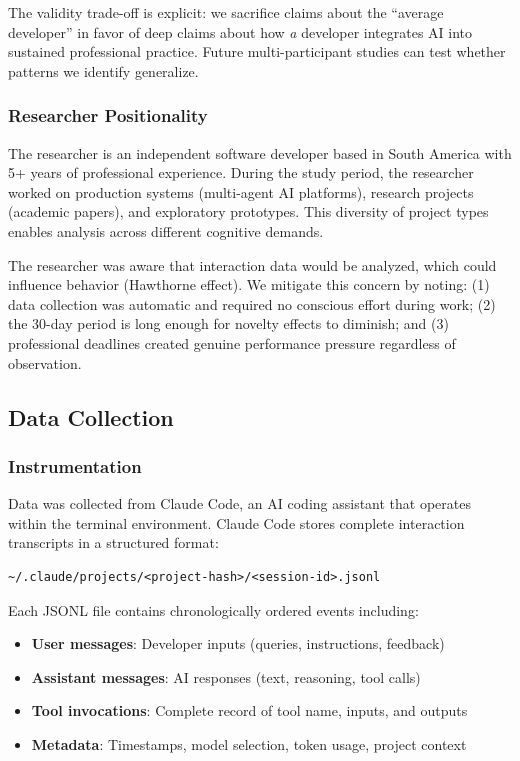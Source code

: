 \documentclass{ntlabs-preprint}
\begin{document}
The validity trade-off is explicit: we sacrifice claims about the ``average developer'' in favor of deep claims about how \textit{a} developer integrates AI into sustained professional practice. Future multi-participant studies can test whether patterns we identify generalize.

\subsubsection{Researcher Positionality}

The researcher is an independent software developer based in South America with 5+ years of professional experience. During the study period, the researcher worked on production systems (multi-agent AI platforms), research projects (academic papers), and exploratory prototypes. This diversity of project types enables analysis across different cognitive demands.

The researcher was aware that interaction data would be analyzed, which could influence behavior (Hawthorne effect). We mitigate this concern by noting: (1) data collection was automatic and required no conscious effort during work; (2) the 30-day period is long enough for novelty effects to diminish; and (3) professional deadlines created genuine performance pressure regardless of observation.

\subsection{Data Collection}

\subsubsection{Instrumentation}

Data was collected from Claude Code, an AI coding assistant that operates within the terminal environment. Claude Code stores complete interaction transcripts in a structured format:

\begin{lstlisting}[caption={Session storage location}]
~/.claude/projects/<project-hash>/<session-id>.jsonl
\end{lstlisting}

Each JSONL file contains chronologically ordered events including:
\begin{itemize}
    \item \textbf{User messages}: Developer inputs (queries, instructions, feedback)
    \item \textbf{Assistant messages}: AI responses (text, reasoning, tool calls)
    \item \textbf{Tool invocations}: Complete record of tool name, inputs, and outputs
    \item \textbf{Metadata}: Timestamps, model selection, token usage, project context
\end{itemize}
\end{document}
